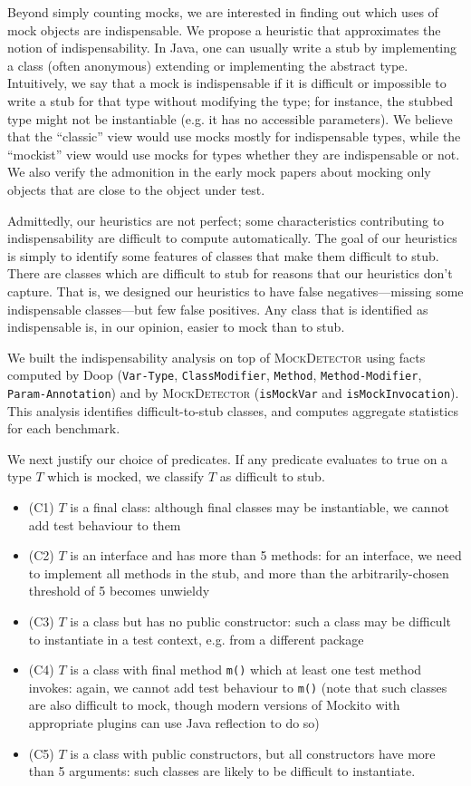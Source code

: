 Beyond simply counting mocks, we are interested in finding out which
uses of mock objects are indispensable.  We propose a heuristic that
approximates the notion of indispensability. In Java, one can usually
write a stub by implementing a class (often anonymous) extending or
implementing the abstract type. Intuitively, we say that a mock is
indispensable if it is difficult or impossible to write a stub for
that type without modifying the type; for instance, the stubbed type might
not be instantiable (e.g. it has no accessible parameters). We believe that
the ``classic'' view would use mocks mostly for indispensable types, while
the ``mockist'' view would use mocks for types whether they are indispensable or not.
We also verify the admonition in the early mock papers about mocking only objects
that are close to the object under test.

Admittedly, our heuristics are not perfect; some characteristics contributing
to indispensability are difficult to compute automatically. The goal of our heuristics
is simply to identify some features of classes that make them difficult to stub.
There are classes which are difficult to stub for reasons that our heuristics don't capture.
That is, we designed our heuristics to have false negatives---missing some indispensable
classes---but few false positives. Any class that is identified as indispensable is,
in our opinion, easier to mock than to stub.

We built the indispensability analysis on top of \textsc{MockDetector}
using facts computed by Doop
(\texttt{Var-Type}, \texttt{ClassModifier}, \texttt{Method}, \texttt{Method-Modifier}, \texttt{Param-Annotation})
and by \textsc{MockDetector} (\texttt{isMockVar}
and \texttt{isMockInvocation}). This analysis identifies difficult-to-stub classes, and
computes aggregate statistics for each benchmark.

We next justify our choice of predicates. If any predicate evaluates to true on a type $T$ which is mocked, we 
classify $T$ as difficult to stub.

\begin{itemize}
\item (C1) $T$ is a final class: although final classes may be instantiable, we cannot add test behaviour to them
\item (C2) $T$ is an interface and has more than 5 methods: for an interface, we need to implement all methods in the stub, and more than the arbitrarily-chosen threshold of 5 becomes unwieldy
\item (C3) $T$ is a class but has no public constructor: such a class may be difficult to instantiate in a test context, e.g. from a different package
\item (C4) $T$ is a class with final method \texttt{m()} which at least one test method invokes: again, we cannot add test behaviour to \texttt{m()} (note that such classes are also difficult to mock, though modern versions of Mockito with appropriate plugins can use Java reflection to do so)
\item (C5) $T$ is a class with public constructors, but all constructors have more than 5 arguments: such classes are likely to be difficult to instantiate.
\end{itemize}

